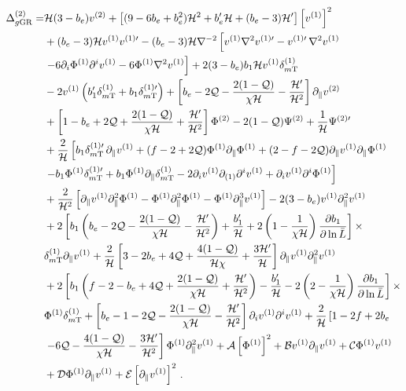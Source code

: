 \begin{align} \label{eq:DeltaSOwBGcoeffs}
	\Delta_{g\mathrm{GR}}^{(2)} =& \mathcal{H} (3-b_e) v^{(2)} + \left[ ( 9 - 6 b_e + b_e^2 ) \mathcal{H}^2 + b_e'\mathcal{H} + ( b_e - 3) \mathcal{H}' \right] \left[ v^{(1)} \right]^2 \nonumber \\
	&+ (b_e - 3) \mathcal{H} v^{(1)} {v^{(1)\prime}} - (b_e - 3) \mathcal{H} \nabla^{-2} \left[ v^{(1)} \nabla^2 v^{(1)\prime} - v^{(1)\prime} \, \nabla^2 v^{(1)}  \right. \nonumber \\
	&\left. - 6\partial_{i}\Phi^{(1)} \partial^i v^{(1)} - 6\Phi^{(1)} \nabla^2 v^{(1)} \right] + 2 (3 - b_e) b_1 \mathcal{H} v^{(1)} \delta_{m\mathrm{T}}^{(1)}  \nonumber \\
	& - 2 v^{(1)} \left( b_1' \delta_{m\mathrm{T}}^{(1)} + b_1 \delta_{m\mathrm{T}}^{(1)\prime} \right) + \left[ b_e - 2 \mathcal{Q} - \frac{2 (1 - \mathcal{Q})}{\chi\mathcal{H}} - \frac{\mathcal{H}'}{\mathcal{H}^2} \right] \partial_\parallel v^{(2)} \nonumber \\
	&+ \left[ 1-b_e + 2 \mathcal{Q} + \frac{ 2 (1 - \mathcal{Q})}{\chi\mathcal{H}} + \frac{\mathcal{H}'}{\mathcal{H}^{2}} \right] \Phi^{(2)} - 2 (1 - \mathcal{Q}) \Psi^{(2)} + \frac{1}{\mathcal{H}}{\Psi^{(2)\prime}} \nonumber \\
	&+ \frac{2}{\mathcal{H}}\left[ b_1 {\delta_{m\mathrm{T}}^{(1)\prime}} \, \partial_\parallel v^{(1)} + (f - 2 + 2\mathcal{Q} ) \Phi^{(1)} \partial_\parallel \Phi^{(1)} + (2 - f - 2\mathcal{Q}) \partial_\parallel v^{(1)} \partial_\parallel \Phi^{(1)} \right. \nonumber \\
	&\left. - b_1 \Phi^{(1)} {\delta_{m\mathrm{T}}^{(1)\prime}} + b_1 \Phi^{(1)} \partial_\parallel \delta_{m\mathrm{T}}^{(1)} - 2\partial_i v^{(1)} \partial_{(1)} \partial^i v^{(1)} + \partial_i v^{(1)} \partial^i \Phi^{(1)} \right] \nonumber \\
	& + \frac{2}{\mathcal{H}^2} \left[ \partial_\parallel v^{(1)} \partial_\parallel^2 \Phi^{(1)} - \Phi^{(1)} \partial_\parallel^2 \Phi^{(1)} - \Phi^{(1)} \partial_\parallel^3 v^{(1)} \right] - 2 (3-b_e) v^{(1)} \partial_\parallel^2 v^{(1)} \nonumber \\
	&+ 2\left[ b_1 \left(b_e - 2\mathcal{Q} - \frac{2 (1 - \mathcal{Q})}{\chi\mathcal{H}} - \frac{\mathcal{H}'}{\mathcal{H}^2} \right) + \frac{b_1'}{\mathcal{H}} + 2\left(1 - \frac{1}{\chi\mathcal{H}} \right) \frac{\partial b_1}{\partial \ln{\bar{L}}} \right] \times \nonumber \\
	& \delta_{m\mathrm{T}}^{(1)} \partial_\parallel v^{(1)} + \frac{2}{\mathcal{H}} \left[ 3 - 2 b_e + 4 \mathcal{Q} + \frac{4 (1 - \mathcal{Q})}{\mathcal{H}\chi} + \frac{3\mathcal{H}'}{\mathcal{H}} \right] \partial_\parallel v^{(1)} \partial_\parallel^2 v^{(1)} \nonumber \\
	& + 2\left[ b_1 \left( f - 2 - b_e + 4 \mathcal{Q} + \frac{2 (1 - \mathcal{Q})}{\chi\mathcal{H}} + \frac{\mathcal{H}'}{\mathcal{H}^2} \right) - \frac{b_1'}{\mathcal{H}} - 2 \left( 2 - \frac{1}{\chi\mathcal{H}} \right) \frac{\partial b_1}{\partial \ln{\bar{L}}} \right] \times \nonumber \\
	& \Phi^{(1)} \delta_{m\mathrm{T}}^{(1)} + \left[b_e - 1 - 2\mathcal{Q} - \frac{2 (1 - \mathcal{Q})}{\chi\mathcal{H}} - \frac{\mathcal{H}'}{\mathcal{H}^{2}}\right] \partial_i v^{(1)} \partial^i v^{(1)} + \frac{2}{\mathcal{H}} \left[1 - 2f + 2b_e \right. \nonumber \\
	& \left. - 6\mathcal{Q} - \frac{4 (1 - \mathcal{Q})}{\chi\mathcal{H}} - \frac{3\mathcal{H}'}{\mathcal{H}^{2}} \right] \Phi^{(1)} \partial_\parallel^2 v^{(1)} + \mathcal{A} \left[ \Phi^{(1)} \right]^2 + \mathcal{B} v^{(1)} \partial_\parallel v^{(1)} + \mathcal{C}\Phi^{(1)} v^{(1)} \nonumber \\
	&+ \mathcal{D} \Phi^{(1)} \partial_\parallel v^{(1)} + \mathcal{E} \left[ \partial_\parallel v^{(1)} \right]^{2}\,.
\end{align}
